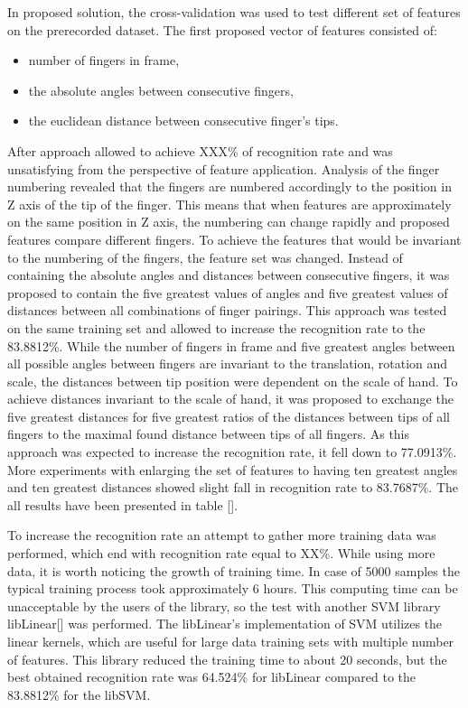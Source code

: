 In proposed solution, the cross-validation was used to test different set of features on the prerecorded dataset. The first proposed vector of features consisted of:
\begin{itemize}
\item number of fingers in frame,
\item the absolute angles between consecutive fingers,
\item the euclidean distance between consecutive finger's tips.
\end{itemize} 
After approach allowed to achieve XXX\% of recognition rate and was unsatisfying from the perspective of feature application. 
Analysis of the finger numbering revealed that the fingers are numbered accordingly to the position in Z axis of the tip of the finger.
This means that when features are approximately on the same position in Z axis, the numbering can change rapidly and proposed features compare different fingers.
To achieve the features that would be invariant to the numbering of the fingers, the feature set was changed.
Instead of containing the absolute angles and distances between consecutive fingers, it was proposed to contain the five greatest values of angles and five greatest values of distances between all combinations of finger pairings.
This approach was tested on the same training set and allowed to increase the recognition rate to the 83.8812\%.
While the number of fingers in frame and five greatest angles between all possible angles between fingers are invariant to the translation, rotation and scale, the distances between tip position were dependent on the scale of hand.
To achieve distances invariant to the scale of hand, it was proposed to exchange the five greatest distances for five greatest ratios of the distances between tips of all fingers to the maximal found distance between tips of all fingers.
As this approach was expected to increase the recognition rate, it fell down to 77.0913\%.
More experiments with enlarging the set of features to having ten greatest angles and ten greatest distances showed slight fall in recognition rate to 83.7687\%. 
The all results have been presented in table [].

To increase the recognition rate an attempt to gather more training data was performed, which end with recognition rate equal to XX\%. 
While using more data, it is worth noticing the growth of training time. In case of 5000 samples the typical training process took approximately 6 hours. 
This computing time can be unacceptable by the users of the library, so the test with another SVM library libLinear[] was performed. 
The libLinear's implementation of SVM utilizes the linear kernels, which are useful for large data training sets with multiple number of features. 
This library reduced the training time to about 20 seconds, but the best obtained recognition rate was 64.524\% for libLinear compared to the 83.8812\% for the libSVM.


